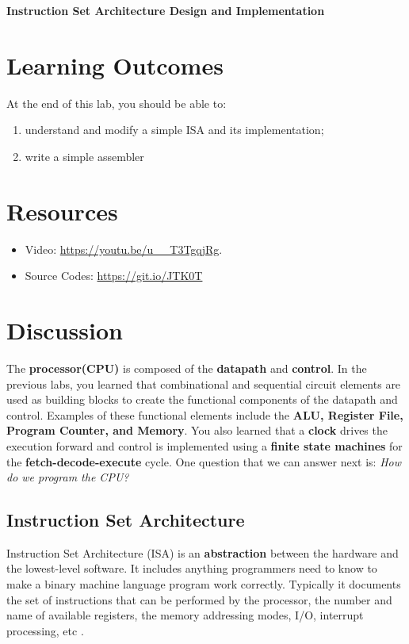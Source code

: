 \documentclass[a4paper, 11pt,oneside]{article}
\begin{document}
\begin{center}
	{\LARGE \textbf{Instruction Set Architecture Design and Implementation}}
\end{center}

\section*{Learning Outcomes}
   At the end of this lab, you should be able to:
   \begin{enumerate}[itemsep=0pt,parsep=0pt]
   	   \item understand and modify a simple ISA and its implementation;
       \item write a simple assembler
   \end{enumerate}   
\tableofcontents

\section{Resources}
\begin{itemize}
	\item Video: 
	\href{https://youtu.be/u\_\_T3TgqjRg}{https://youtu.be/u\_\_T3TgqjRg}.
	\item Source Codes: \href{https://git.io/JTK0T}{https://git.io/JTK0T}
\end{itemize}	

\section{Discussion}
The \textbf{processor(CPU)} is composed of the \textbf{datapath} and 
\textbf{control}. In the previous labs, you learned that combinational and 
sequential circuit elements are used as building blocks to create the 
functional components of the datapath and control. Examples of these functional 
elements include the \textbf{ALU, Register File, Program Counter, and Memory}. 
You also learned that a \textbf{clock} drives the execution forward and control 
is implemented using a \textbf{finite state machines} for the 
\textbf{fetch-decode-execute} cycle. One question that we can answer next is: 
\textit{How do we program the CPU?}


\subsection{Instruction Set Architecture}
Instruction Set Architecture (ISA) is an \textbf{abstraction} between the 
hardware and the lowest-level software. It includes anything programmers need 
to know to make a binary machine language program work correctly. Typically it  
documents the set of instructions that can be performed by the 
processor, the number and name of available registers, the memory 
addressing modes, I/O, interrupt processing, etc \cite{CODARM}.
\end{document}

